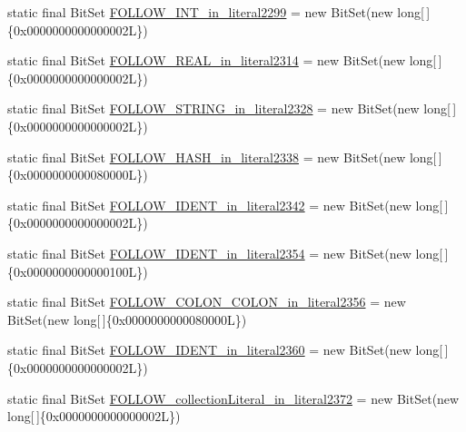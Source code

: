 \begin{DoxyCompactItemize}
\item 
static final Bit\-Set \hyperlink{classorg_1_1tzi_1_1use_1_1parser_1_1ocl_1_1_o_c_l_parser_aad3f67141a28278f54ee0ae9acc7623a}{F\-O\-L\-L\-O\-W\-\_\-\-I\-N\-T\-\_\-in\-\_\-literal2299} = new Bit\-Set(new long\mbox{[}$\,$\mbox{]}\{0x0000000000000002\-L\})
\item 
static final Bit\-Set \hyperlink{classorg_1_1tzi_1_1use_1_1parser_1_1ocl_1_1_o_c_l_parser_ac050f9c38fd5b6aad093444683306741}{F\-O\-L\-L\-O\-W\-\_\-\-R\-E\-A\-L\-\_\-in\-\_\-literal2314} = new Bit\-Set(new long\mbox{[}$\,$\mbox{]}\{0x0000000000000002\-L\})
\item 
static final Bit\-Set \hyperlink{classorg_1_1tzi_1_1use_1_1parser_1_1ocl_1_1_o_c_l_parser_a91534ad588b69716c2c28e1d0305426f}{F\-O\-L\-L\-O\-W\-\_\-\-S\-T\-R\-I\-N\-G\-\_\-in\-\_\-literal2328} = new Bit\-Set(new long\mbox{[}$\,$\mbox{]}\{0x0000000000000002\-L\})
\item 
static final Bit\-Set \hyperlink{classorg_1_1tzi_1_1use_1_1parser_1_1ocl_1_1_o_c_l_parser_a5094d6dfa8a1d3fcffbd6c540ee118bc}{F\-O\-L\-L\-O\-W\-\_\-\-H\-A\-S\-H\-\_\-in\-\_\-literal2338} = new Bit\-Set(new long\mbox{[}$\,$\mbox{]}\{0x0000000000080000\-L\})
\item 
static final Bit\-Set \hyperlink{classorg_1_1tzi_1_1use_1_1parser_1_1ocl_1_1_o_c_l_parser_a0682b640c30778dc114ea1b8856e69fc}{F\-O\-L\-L\-O\-W\-\_\-\-I\-D\-E\-N\-T\-\_\-in\-\_\-literal2342} = new Bit\-Set(new long\mbox{[}$\,$\mbox{]}\{0x0000000000000002\-L\})
\item 
static final Bit\-Set \hyperlink{classorg_1_1tzi_1_1use_1_1parser_1_1ocl_1_1_o_c_l_parser_ac815e5e6d3470e33a36f249bcef8935d}{F\-O\-L\-L\-O\-W\-\_\-\-I\-D\-E\-N\-T\-\_\-in\-\_\-literal2354} = new Bit\-Set(new long\mbox{[}$\,$\mbox{]}\{0x0000000000000100\-L\})
\item 
static final Bit\-Set \hyperlink{classorg_1_1tzi_1_1use_1_1parser_1_1ocl_1_1_o_c_l_parser_a68bdb9ccdb7cee1bd5a551e85ecf1cf3}{F\-O\-L\-L\-O\-W\-\_\-\-C\-O\-L\-O\-N\-\_\-\-C\-O\-L\-O\-N\-\_\-in\-\_\-literal2356} = new Bit\-Set(new long\mbox{[}$\,$\mbox{]}\{0x0000000000080000\-L\})
\item 
static final Bit\-Set \hyperlink{classorg_1_1tzi_1_1use_1_1parser_1_1ocl_1_1_o_c_l_parser_ac3c906e1b85fe45aa3868eebe2c0e533}{F\-O\-L\-L\-O\-W\-\_\-\-I\-D\-E\-N\-T\-\_\-in\-\_\-literal2360} = new Bit\-Set(new long\mbox{[}$\,$\mbox{]}\{0x0000000000000002\-L\})
\item 
static final Bit\-Set \hyperlink{classorg_1_1tzi_1_1use_1_1parser_1_1ocl_1_1_o_c_l_parser_ac43a36bc325663dda636adc5fd64a37d}{F\-O\-L\-L\-O\-W\-\_\-collection\-Literal\-\_\-in\-\_\-literal2372} = new Bit\-Set(new long\mbox{[}$\,$\mbox{]}\{0x0000000000000002\-L\})

\end{DoxyCompactItemize}
